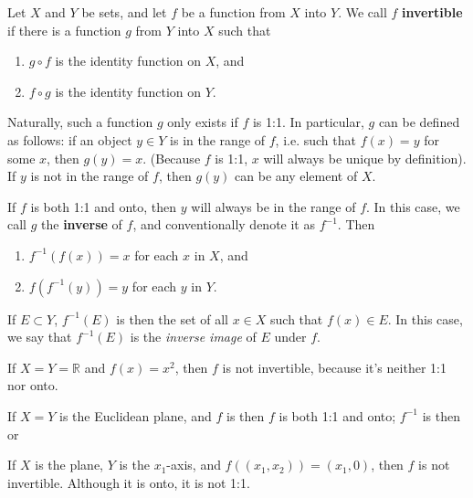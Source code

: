 \documentclass[12pt]{article}
\begin{document}
\begin{defn}
  Let $X$ and $Y$ be sets, and let $f$ be a function from $X$ into $Y$. We call $f$
  \textbf{invertible} if there is a function $g$ from $Y$ into $X$ such that
  \begin{enumerate}
    \item
      $g \circ f$ is the identity function on $X$, and
    \item
      $f \circ g$ is the identity function on $Y$.
  \end{enumerate}

  Naturally, such a function $g$ only exists if $f$ is 1:1. In particular, $g$ can be
  defined as follows: if an object $y \in Y$ is in the range of $f$, i.e. such that
  $f(x) = y$ for some $x$, then $g(y) = x$. (Because $f$ is 1:1, $x$ will always be
  unique by definition). If $y$ is not in the range of $f$, then $g(y)$ can be any
  element of $X$.

  If $f$ is both 1:1 and onto, then $y$ will always be in the range of $f$. In this
  case, we call $g$ the \textbf{inverse} of $f$, and conventionally denote it as
  $f^{-1}$. Then
  \begin{enumerate}
    \item
      $f^{-1}(f(x)) = x$ for each $x$ in $X$, and
    \item
      $f(f^{-1}(y)) = y$ for each $y$ in $Y$.
  \end{enumerate}

  If $E \subset Y$, $f^{-1}(E)$ is then the set of all $x \in X$ such that $f(x) \in
  E$. In this case, we say that $f^{-1}(E)$ is the \textit{inverse image} of $E$
  under $f$.
\end{defn}

\begin{exm}
  If $X = Y = \mathbb{R}$ and $f(x) = x^2$, then $f$ is not invertible, because it's
  neither 1:1 nor onto.
\end{exm}

\begin{exm}
  If $X = Y$ is the Euclidean plane, and $f$ is 
  then $f$ is both 1:1 and onto; $f^{-1}$ is then  or 
\end{exm}

\begin{exm}
  If $X$ is the plane, $Y$ is the $x_1$-axis, and $f((x_1,x_2)) = (x_1,0)$, then $f$
  is not invertible. Although it is onto, it is not 1:1.
\end{exm}
\end{document}
